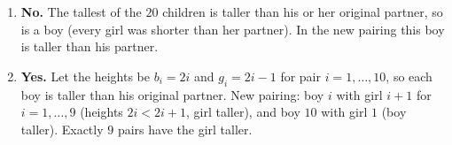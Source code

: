 \begin{enumerate}
\item \textbf{No.} The tallest of the $20$ children is taller than his or her original partner, so is a boy (every girl was shorter than her partner). In the new pairing this boy is taller than his partner.
\item \textbf{Yes.} Let the heights be $b_i=2i$ and $g_i=2i-1$ for pair $i=1,\dots,10$, so each boy is taller than his original partner. New pairing: boy $i$ with girl $i+1$ for $i=1,\dots,9$ (heights $2i<2i+1$, girl taller), and boy $10$ with girl $1$ (boy taller). Exactly $9$ pairs have the girl taller.
\end{enumerate}

